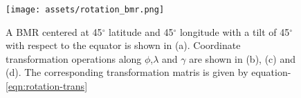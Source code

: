 \documentclass[twoside,12pt]{book}
\begin{document}
\begin{figure}
    \centering
    \texttt{[image: assets/rotation\_bmr.png]}
    \caption{A BMR centered at 45$^{\circ}$ latitude and 45$^{\circ}$ longitude with a tilt of 45$^{\circ}$ with respect to the equator is shown in (a). Coordinate transformation operations along $\phi$,$\lambda$ and $\gamma$ are shown in (b), (c) and (d). The corresponding transformation matris is given by equation-\ref{eqn:rotation-trans}}
    \label{fig:rotation-bmr}
\end{figure}






\end{document}
